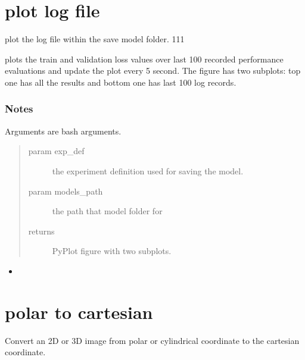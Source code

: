 \documentclass[letterpaper,10pt,english]{sphinxmanual}
\begin{document}
\section{plot log file}
\label{\detokenize{index:module-util.plot_log_file}}\label{\detokenize{index:plot-log-file}}
plot the log file within the save model folder. 111

plots the train and validation loss values over last 100 recorded performance evaluations and update the
plot every 5 second.  The figure has two subplots: top one has all the results and bottom one has last 100 log
records.
\subsubsection*{Notes}

Arguments are bash arguments.
\begin{quote}\begin{description}
\item[{param exp\_def}] \leavevmode
the experiment definition used for saving the model.

\item[{param models\_path}] \leavevmode
the path that model folder for 

\item[{returns}] \leavevmode
PyPlot figure with two subplots.

\end{description}\end{quote}



\begin{itemize}
\item {} 

\end{itemize}




\section{polar to cartesian}
\label{\detokenize{index:module-util.polar2cartesian}}\label{\detokenize{index:polar-to-cartesian}}
Convert an 2D or 3D image from polar or cylindrical coordinate to the
cartesian coordinate.
\end{document}
